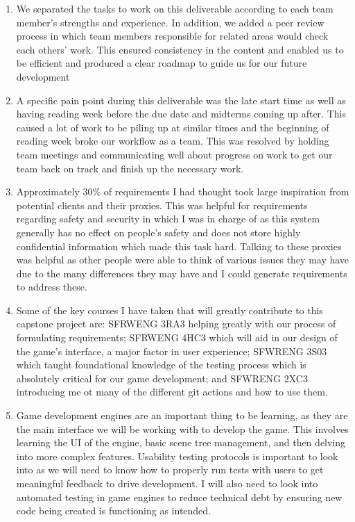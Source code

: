 \documentclass{scrreprt}
\newcounter{SFR}
\theoremstyle{definition}
\begin{document}
	\begin{enumerate}
		\item We separated the tasks to work on this deliverable according to each team member's strengths and experience. In addition, we added a peer review process in which team members responsible for related areas would check each others' work. This ensured consistency in the content and enabled us to be efficient and produced a clear roadmap to guide us for our future development
		\item A specific pain point during this deliverable was the late start time as well as having reading week before the due date and midterms coming up after. This caused a lot of work to be piling up at similar times and the beginning of reading week broke our workflow as a team. This was resolved by holding team meetings and communicating well about progress on work to get our team back on track and finish up the necessary work.
		\item Approximately 30\% of requirements I had thought took large inspiration from potential clients and their proxies. This was helpful for requirements regarding safety and security in which I was in charge of as this system generally has no effect on people’s safety and does not store highly confidential information which made this task hard. Talking to these proxies was helpful as other people were able to think of various issues they may have due to the many differences they may have and I could generate requirements to address these.
		\item Some of the key courses I have taken that will greatly contribute to this capstone project are: SFRWENG 3RA3 helping greatly with our process of formulating requirements; SFRWENG 4HC3 which will aid in our design of the game’s interface, a major factor in user experience; SFWRENG 3S03 which taught foundational knowledge of the testing process which is absolutely critical for our game development; and SFWRENG 2XC3 introducing me ot many of the different git actions and how to use them.
		\item Game development engines are an important thing to be learning, as they are the main interface we will be working with to develop the game. This involves learning the UI of the engine, basic scene tree management, and then delving into more complex features. Usability testing protocols is important to look into as we will need to know how to properly run tests with users to get meaningful feedback to drive development. I will also need to look into automated testing in game engines to reduce technical debt by ensuring new code being created is functioning as intended.

\end{enumerate}
\end{document}
